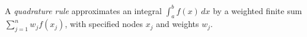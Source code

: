 
A \emph{quadrature rule} approximates an integral $\int_a^bf(x)\,dx$ by a weighted finite sum $\sum_{j=1}^nw_jf(x_j)$, with specified nodes $x_j$ and weights $w_j$.
